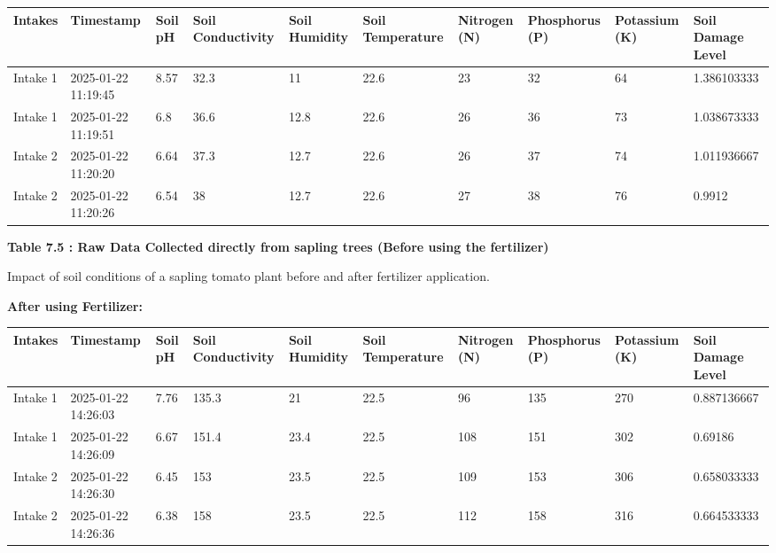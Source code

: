 \documentclass{book} %
\begin{document}
\begin{tabular}{|p{0.4in}|p{0.5in}|p{0.4in}|p{0.4in}|p{0.4in}|p{0.4in}|p{0.4in}|p{0.4in}|p{0.4in}|p{0.4in}|} \hline 
Intakes & Timestamp & Soil pH & Soil Conductivity & Soil Humidity & Soil Temperature & Nitrogen (N) & Phosphorus (P) & Potassium (K) & Soil Damage Level \\ \hline 
Intake 1 & 2025-01-22 11:19:45 & 8.57 & 32.3 & 11 & 22.6 & 23 & 32 & 64 & 1.386103333 \\ \hline 
Intake 1 & 2025-01-22 11:19:51 & 6.8 & 36.6 & 12.8 & 22.6 & 26 & 36 & 73 & 1.038673333 \\ \hline 
Intake 2 & 2025-01-22 11:20:20 & 6.64 & 37.3 & 12.7 & 22.6 & 26 & 37 & 74 & 1.011936667 \\ \hline 
Intake 2 & 2025-01-22 11:20:26 & 6.54 & 38 & 12.7 & 22.6 & 27 & 38 & 76 & 0.9912 \\ \hline 
\end{tabular}

\textbf{Table 7.5 : Raw Data Collected directly from sapling trees (Before using the fertilizer)}

\noindent \textbf{}

\noindent 

\noindent Impact of soil conditions of a sapling tomato plant before and after fertilizer application.\textbf{}

\noindent \textbf{}

\noindent \textbf{After using Fertilizer:}

\noindent 

\begin{tabular}{|p{0.4in}|p{0.5in}|p{0.4in}|p{0.4in}|p{0.4in}|p{0.4in}|p{0.4in}|p{0.4in}|p{0.4in}|p{0.4in}|} \hline 
Intakes & Timestamp & Soil pH & Soil Conductivity & Soil Humidity & Soil Temperature & Nitrogen (N) & Phosphorus (P) & Potassium (K) & Soil Damage Level \\ \hline 
Intake 1 & 2025-01-22 14:26:03 & 7.76 & 135.3 & 21 & 22.5 & 96 & 135 & 270 & 0.887136667 \\ \hline 
Intake 1 & 2025-01-22 14:26:09 & 6.67 & 151.4 & 23.4 & 22.5 & 108 & 151 & 302 & 0.69186 \\ \hline 
Intake 2 & 2025-01-22 14:26:30 & 6.45 & 153 & 23.5 & 22.5 & 109 & 153 & 306 & 0.658033333 \\ \hline 
Intake 2 & 2025-01-22 14:26:36 & 6.38 & 158 & 23.5 & 22.5 & 112 & 158 & 316 & 0.664533333 \\ \hline 
\end{tabular}
\end{document}
